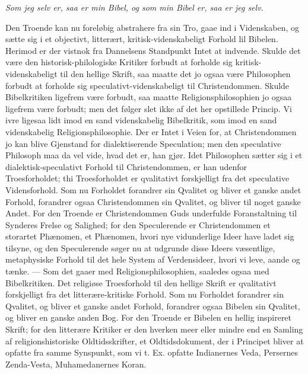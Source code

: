 \documentclass[12pt,a4paper]{book}
\newcommand{\opage}[1]{\marginnote{\footnotesize\textit{[#1]}}}
\begin{document}
\emph{Som jeg selv er, saa er min Bibel, og som min Bibel er, saa er jeg selv.}

Den Troende kan nu foreløbig abstrahere fra sin Tro, gaae ind i Videnskaben, og
sætte sig i et objectivt, litterært, kritisk-videnskabeligt Forhold lil
Bibelen. Herimod er der vistnok fra Dannelsens Standpunkt Intet at indvende.
Skulde det være den historisk-philologiske Kritiker forbudt at forholde sig
kritisk-videnskabeligt til den hellige Skrift, saa maatte det jo ogsaa være
Philosophen forbudt at forholde sig speculativt-videnskabeligt til
Christendommen. Skulde Bibelkritiken ligefrem være forbudt, saa maatte
Religionsphilosophien jo ogsaa ligefrem være forbudt;
\opage{42} men det følger slet ikke af det her opstillede Princip. Vi ivre ligesaa lidt
imod en sand videnskabelig Bibelkritik, som imod en sand videnskabelig
Religionsphilosophie. Der er Intet i Veien for, at Christendommen jo kan blive
Gjenstand for dialektiserende Speculation; men den speculative Philosoph maa da
vel vide, hvad det er, han gjør. Idet Philosophen sætter sig i et
dialektisk-speculativt Forhold til Christendommen, er han udenfor
Troesforholdet; thi Troesforholdet er qvalitativt forskjelligt fra det
speculative Vidensforhold. Som nu Forholdet forandrer sin Qvalitet og bliver et
ganske andet Forhold, forandrer ogsaa Christendommen sin Qvalitet, og bliver
til noget ganske Andet. For den Troende er Christendommen Guds underfulde
Foranstaltning til Synderes Frelse og Salighed; for den Speculerende er
Christendommen et storartet Phænomen, et Phænomen, hvori nye vidunderlige Ideer
have ladet sig tilsyne, og den Speculerende søger nu at udgrunde disse Ideers
væsentlige, metaphysiske Forhold til det hele System af Verdensideer, hvori vi
leve, aande og tænke. --- Som det gaaer med Religionsphilosophien, saaledes
ogsaa med Bibelkritiken. Det religiøse Troesforhold til den hellige Skrift er
qvalitativt forskjelligt fra det litterære-kritiske Forhold. Som nu Forholdet
forandrer sin Qvalitet, og bliver et ganske andet Forhold, forandrer ogsaa
Bibelen sin Qvalitet, og bliver en ganske anden Bog. For den Troende er Bibelen
en hellig inspireret Skrift; for den litterære Kritiker er den hverken meer
eller mindre end en Samling af religionshistoriske Oldtidsskrifter, et
Oldtidsdokument, der i Principet bliver at opfatte fra samme Synspunkt, som vi
t. Ex. opfatte Indianernes Veda, Persernes Zenda-Vesta, Muhamedanernes Koran.
\end{document}
